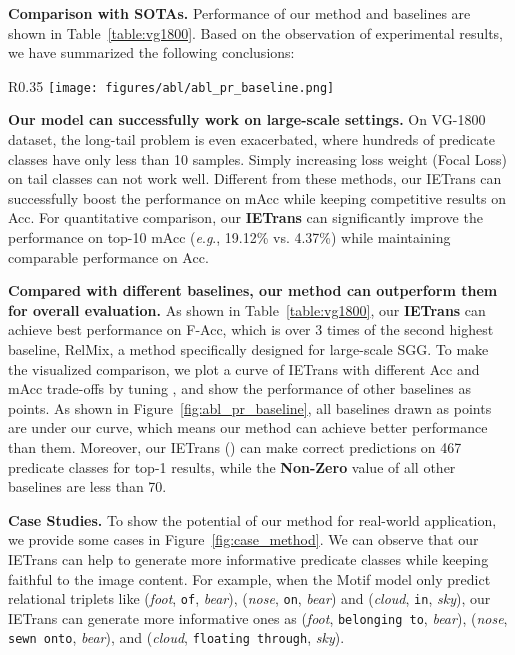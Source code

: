\documentclass[runningheads]{llncs}
\newcommand{\eg}{\textit{e}.\textit{g}.}
\begin{document}
\smallskip
\noindent
\textbf{Comparison with SOTAs.}
Performance of our method and baselines are shown in Table~\ref{table:vg1800}.
Based on the observation of experimental results, we have summarized the following conclusions:

\begin{wrapfigure}{R}{0.35\textwidth}
\centering
        \texttt{[image: figures/abl/abl\_pr\_baseline.png]}
        \caption{The mAcc and Acc curve. (a) is our IETrans method.  is tuned to generate the blue curve. (b-f) are baselines.}
        \label{fig:abl_pr_baseline}
\end{wrapfigure}

\textbf{Our model can successfully work on large-scale settings.}
On VG-1800 dataset, the long-tail problem is even exacerbated, where hundreds of predicate classes have only less than 10 samples.
Simply increasing loss weight (Focal Loss) on tail classes can not work well.
Different from these methods, our IETrans can successfully boost the performance on mAcc while keeping competitive results on Acc.
For quantitative comparison, our \textbf{IETrans}  can significantly improve the performance on top-10 mAcc (\eg, 19.12\% vs. 4.37\%) while maintaining comparable performance on Acc.


\textbf{Compared with different baselines, our method can outperform them for overall evaluation.}
As shown in Table~\ref{table:vg1800}, our \textbf{IETrans}  can achieve best performance on F-Acc, which is over 3 times of the second highest baseline, RelMix, a method specifically designed for large-scale SGG.
To make the visualized comparison, we plot a curve of IETrans with different Acc and mAcc trade-offs by tuning , and show the performance of other baselines as points.
As shown in Figure~\ref{fig:abl_pr_baseline}, all baselines drawn as points are under our curve, which means our method can achieve better performance than them.
Moreover, our IETrans () can make correct predictions on 467 predicate classes for top-1 results, while the \textbf{Non-Zero} value of all other baselines are less than 70. 


\smallskip
\noindent
\textbf{Case Studies.}
To show the potential of our method for real-world application, we provide some cases in Figure~\ref{fig:case_method}.
We can observe that our IETrans can help to generate more informative predicate classes while keeping faithful to the image content.
For example, when the Motif model only predict relational triplets like (\textit{foot}, \texttt{of}, \textit{bear}), (\textit{nose}, \texttt{on}, \textit{bear}) and (\textit{cloud}, \texttt{in}, \textit{sky}), our IETrans can generate more informative ones as (\textit{foot}, \texttt{belonging to}, \textit{bear}), (\textit{nose}, \texttt{sewn onto}, \textit{bear}), and (\textit{cloud}, \texttt{floating through}, \textit{sky}).
\end{document}
